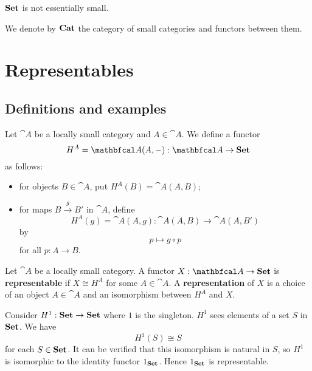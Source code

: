 \documentclass[11pt,a4paper]{article}
\begin{document}
\begin{proposition}
    $\mathbf{Set}$ is not essentially small.
\end{proposition}

\begin{definition}
    We denote by $\mathbf{Cat}$ the category of small categories and functors between them.
\end{definition}

\section{Representables}
\subsection{Definitions and examples}
\begin{definition}
    Let $\cat{A}$ be a locally small category and $A\in\cat{A}$. We define a functor
    \begin{equation*}
        H^A=\cat{A}(A,-): \cat{A}\to\bcat{Set}
    \end{equation*}
    as follows:
    \begin{itemize}
        \item for objects $B\in\cat{A}$, put $H^A(B)=\cat{A}(A,B)$;
        \item for maps $B\xrightarrow{g}B'$ in $\cat{A}$, define
            \begin{equation*}
                H^A(g)=\cat{A}(A,g): \cat{A}(A,B)\to\cat{A}(A,B')
            \end{equation*}
            by
            \begin{equation*}
                p\mapsto g\circ p
            \end{equation*}
            for all $p:A\to B$.
    \end{itemize}
\end{definition}

\begin{definition}
    Let $\cat{A}$ be a locally small category. A functor $X:\cat{A}\to\bcat{Set}$ is \textbf{representable} if $X\cong H^A$ for some $A\in\cat{A}$. A \textbf{representation} of $X$ is a choice of an object $A\in\cat{A}$ and an isomorphism between $H^A$ and $X$.
\end{definition}

\begin{example}
    Consider $H^1:\mathbf{Set}\to\mathbf{Set}$ where $1$ is the singleton. $H^1$ sees elements of a set $S$ in $\mathbf{Set}$. We have
    \begin{equation*}
        H^1(S)\cong S
    \end{equation*}
    for each $S\in\mathbf{Set}$. It can be verified that this isomorphism is natural in $S$, so $H^1$ is isomorphic to the identity functor $1_{\mathbf{Set}}$. Hence $1_{\mathbf{Set}}$ is representable.
\end{example}
\end{document}
